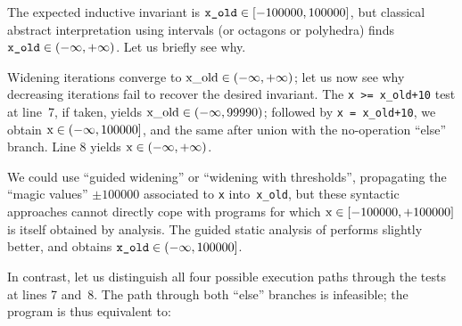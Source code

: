 \documentclass[preprint]{sigplanconf}
\begin{document}
The expected inductive invariant is $\verb|x_old| \in [-100000,100000]$, but classical abstract interpretation using intervals (or octagons or polyhedra) finds $\verb|x_old| \in (-\infty,+\infty)$. %
Let us briefly see why.

Widening iterations converge to $\lstinline|x_old| \in (-\infty,+\infty)$; let us now see why decreasing iterations fail to recover the desired invariant. %
The \lstinline|x >= x_old+10| test at line~7, if taken, yields $\lstinline|x_old| \in (-\infty,99990)$; followed by \lstinline|x = x_old+10|, we obtain $\lstinline|x| \in (-\infty,100000]$, and the same after union with the no-operation ``else'' branch. Line 8 yields $\lstinline|x| \in (-\infty,+\infty)$.

We could use ``guided widening'' or ``widening with thresholds'', propagating the ``magic values'' $\pm 100000$ associated to \lstinline|x| into~\lstinline|x_old|, but these syntactic approaches cannot directly cope with programs for which $\lstinline|x|  \in [-100000,+100000]$ is itself obtained by analysis.
The guided static analysis of \citet{DBLP:conf/sas/GopanR07} performs slightly better, and obtains $\verb|x_old| \in (-\infty,100000]$.

In contrast, let us distinguish all four possible execution paths through the tests at lines 7 and~8. The path through both ``else'' branches is infeasible; the program is thus equivalent to:

\end{document}
